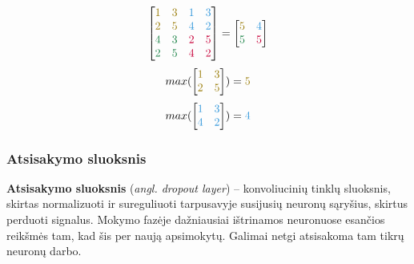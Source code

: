 \documentclass{VUMIFPSbakalaurinis}
\begin{document}
\begin{equation}\label{eq:poll}\def\y{\color{myyellow}}\def\b{\color{myblue}}\def\r{\color{myred}}\def\g{\color{mygreen}}
\begin{bmatrix}
\y{1} & \y{3} & \b{1} & \b{3} \\
\y{2} & \y{5} & \b{4} & \b{2} \\
\g{4} & \g{3} & \r{2} & \r{5} \\
\g{2} & \g{5} & \r{4} & \r{2} \\
\end{bmatrix}
= 
\begin{bmatrix}
\y{5} & \b{4} \\
\g{5} & \r{5} 
\end{bmatrix}
\end{equation}
\begin{equation}\label{eq:poll1}
max(
\begin{bmatrix}
\textcolor{myyellow}{1} & \textcolor{myyellow}{3} \\
\textcolor{myyellow}{2} & \textcolor{myyellow}{5}
\end{bmatrix}
) = \textcolor{myyellow}{5}
\end{equation}
\begin{equation}\label{eq:poll2}
max(
\begin{bmatrix}
\textcolor{myblue}{1} & \textcolor{myblue}{3} \\
\textcolor{myblue}{4} & \textcolor{myblue}{2} 
\end{bmatrix}
) = \textcolor{myblue}{4}
\end{equation}

\subsubsection{Atsisakymo sluoksnis}
\textbf{Atsisakymo sluoksnis} (\textit{angl. dropout layer}) – konvoliucinių tinklų sluoksnis, skirtas normalizuoti ir sureguliuoti tarpusavyje susijusių neuronų sąryšius, skirtus perduoti signalus. Mokymo fazėje dažniausiai ištrinamos neuronuose esančios reikšmės tam, kad šis per naują apsimokytų. Galimai netgi atsisakoma tam tikrų neuronų darbo.
\end{document}
